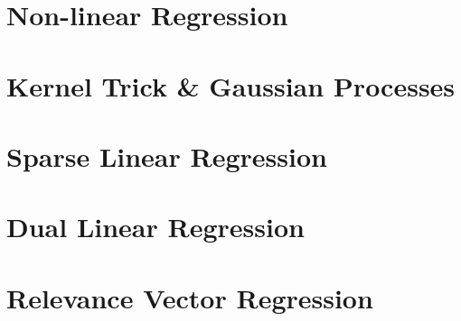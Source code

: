 \section{Non-linear Regression}

\section{Kernel Trick \& Gaussian Processes}

\section{Sparse Linear Regression}

\section{Dual Linear Regression}

\section{Relevance Vector Regression}
